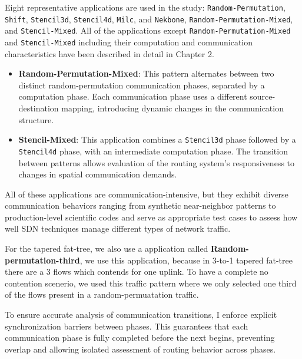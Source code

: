 Eight representative applications are used in the study:
\texttt{Random-Permutation}, \texttt{Shift}, \texttt{Stencil3d}, \texttt{Stencil4d}, \texttt{Milc}, and \texttt{Nekbone}, \texttt{Random-Permutation-Mixed},
and \texttt{Stencil-Mixed}. All of the applications except \texttt{Random-Permutation-Mixed} and \texttt{Stencil-Mixed} including 
their computation and communication characteristics have been described
in detail in Chapter 2.

\begin{itemize}
\item \textbf{Random-Permutation-Mixed}: This pattern alternates between two distinct random-permutation communication phases, separated by a computation phase. Each communication phase uses a different source-destination mapping, introducing dynamic changes in the communication structure.

\item \textbf{Stencil-Mixed}: This application combines a \texttt{Stencil3d} phase followed by a \texttt{Stencil4d} phase, with an intermediate computation phase. The transition between patterns allows evaluation of the routing system’s responsiveness to changes in spatial communication demands.
\end{itemize}

All of these applications are communication-intensive, but 
they exhibit diverse communication behaviors ranging from synthetic
near-neighbor patterns to production-level scientific codes
and serve as appropriate test cases to assess how well SDN techniques
manage different types of network traffic.

For the tapered fat-tree, we also use a application called \textbf{Random-permutation-third}, we use this application, because in 3-to-1 tapered fat-tree there are a 3 flows which contends for one uplink. To have a complete no contention scenerio, we used this traffic pattern where we only selected one third of the flows present in a random-permuatation traffic.

To ensure accurate analysis of communication transitions, I enforce
explicit synchronization barriers between phases. This guarantees
that each communication phase is fully completed before the next begins,
preventing overlap and allowing isolated assessment of routing behavior across phases.
